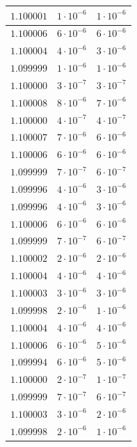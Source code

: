 \begin{table}[h]
\begin{tabular}{|c|c|c|}
       \hline
       $1.100001$ & $1 \cdot 10^{-6}$ & $1 \cdot 10^{-6}$ \\
       \hline
       $1.100006$ & $6 \cdot 10^{-6}$ & $6 \cdot 10^{-6}$ \\
       \hline
       $1.100004$ & $4 \cdot 10^{-6}$ & $3 \cdot 10^{-6}$ \\
       \hline
       $1.099999$ & $1 \cdot 10^{-6}$ & $1 \cdot 10^{-6}$ \\
       \hline
       $1.100000$ & $3 \cdot 10^{-7}$ & $3 \cdot 10^{-7}$ \\
       \hline
       $1.100008$ & $8 \cdot 10^{-6}$ & $7 \cdot 10^{-6}$ \\
       \hline
       $1.100000$ & $4 \cdot 10^{-7}$ & $4 \cdot 10^{-7}$ \\
       \hline
       $1.100007$ & $7 \cdot 10^{-6}$ & $6 \cdot 10^{-6}$ \\
       \hline
       $1.100006$ & $6 \cdot 10^{-6}$ & $6 \cdot 10^{-6}$ \\
       \hline
       $1.099999$ & $7 \cdot 10^{-7}$ & $6 \cdot 10^{-7}$ \\
       \hline
       $1.099996$ & $4 \cdot 10^{-6}$ & $3 \cdot 10^{-6}$ \\
       \hline
       $1.099996$ & $4 \cdot 10^{-6}$ & $3 \cdot 10^{-6}$ \\
       \hline
       $1.100006$ & $6 \cdot 10^{-6}$ & $6 \cdot 10^{-6}$ \\
       \hline
       $1.099999$ & $7 \cdot 10^{-7}$ & $6 \cdot 10^{-7}$ \\
       \hline
       $1.100002$ & $2 \cdot 10^{-6}$ & $2 \cdot 10^{-6}$ \\
       \hline
       $1.100004$ & $4 \cdot 10^{-6}$ & $4 \cdot 10^{-6}$ \\
       \hline
       $1.100003$ & $3 \cdot 10^{-6}$ & $3 \cdot 10^{-6}$ \\
       \hline
       $1.099998$ & $2 \cdot 10^{-6}$ & $1 \cdot 10^{-6}$ \\
       \hline
       $1.100004$ & $4 \cdot 10^{-6}$ & $4 \cdot 10^{-6}$ \\
       \hline
       $1.100006$ & $6 \cdot 10^{-6}$ & $5 \cdot 10^{-6}$ \\
       \hline
       $1.099994$ & $6 \cdot 10^{-6}$ & $5 \cdot 10^{-6}$ \\
       \hline
       $1.100000$ & $2 \cdot 10^{-7}$ & $1 \cdot 10^{-7}$ \\
       \hline
       $1.099999$ & $7 \cdot 10^{-7}$ & $6 \cdot 10^{-7}$ \\
       \hline
       $1.100003$ & $3 \cdot 10^{-6}$ & $2 \cdot 10^{-6}$ \\
       \hline
       $1.099998$ & $2 \cdot 10^{-6}$ & $1 \cdot 10^{-6}$ \\
       \hline
   \end{tabular}
\end{table}


